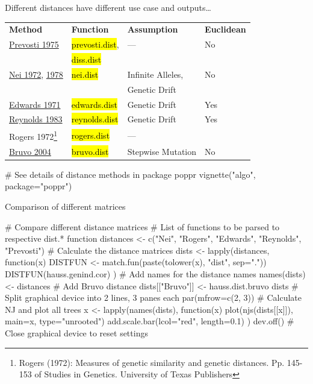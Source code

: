 \documentclass[compress, ucs, xelatex, 11pt, xcolor=svgnames,
  hyperref={
    bookmarks=true,
    unicode=true,
    colorlinks=true,
    pdftitle={Molecular data in R},
    plainpages=false,
    pdfauthor={Vojtech Zeisek},
    pdfsubject={Course about phylogeny and evolution in R},
    pdfcreator={XeLaTeX},
    pdfkeywords={R, evolution, phylogeny, molecular data},
    linkcolor=Tomato,
    anchorcolor=SaddleBrown,
    citecolor=Goldenrod,
    filecolor=DarkMagenta,
    menucolor=Sienna,
    urlcolor=DarkTurquoise,
    pdftex},
  url={hyphens, lowtilde} %
  ]{beamer}
\renewcommand{\texttt}[1]{\hl{\ttfamily #1}}
\begin{document}
\begin{frame}[fragile]{Different distances have different use case and outputs\ldots}
  \vfill
  \begin{tabular}{llll}
    \textbf{Method} & \textbf{Function} & \textbf{Assumption} & \textbf{Euclidean}\\
    \href{http://link.springer.com/article/10.1007/BF00831894}{Prevosti 1975} & \texttt{prevosti.dist}, & --- & \alert{No}\\
     & \texttt{diss.dist} & & \\
    \href{http://www.jstor.org/stable/2459777}{Nei 1972}, \href{http://www.genetics.org/content/89/3/583.short}{1978} & \texttt{nei.dist} & Infinite Alleles, & \alert{No}\\
     & & Genetic Drift & \\
    \href{http://www.jstor.org/stable/2528824}{Edwards 1971} & \texttt{edwards.dist} & Genetic Drift & Yes\\
    \href{http://www.genetics.org/node/324318.full}{Reynolds 1983} & \texttt{reynolds.dist} & Genetic Drift & Yes\\
    Rogers 1972\footnote{Rogers (1972): Measures of genetic similarity and genetic distances. Pp. 145-153 of Studies in Genetics. University of Texas Publishers} & \texttt{rogers.dist} & --- &\\
    \href{http://onlinelibrary.wiley.com/doi/10.1111/j.1365-294X.2004.02209.x/full}{Bruvo 2004} & \texttt{bruvo.dist} & Stepwise Mutation & \alert{No}
  \end{tabular}
  \vfill
  \begin{spluscode}
    # See details of distance methods in package poppr
    vignette("algo", package="poppr")
  \end{spluscode}
  \vfill
\end{frame}

\begin{frame}[fragile]{Comparison of different matrices}
  \begin{spluscode}
    # Compare different distance matrices
    # List of functions to be parsed to respective dist.* function
    distances <- c("Nei", "Rogers", "Edwards", "Reynolds", "Prevosti")
    # Calculate the distance matrices
    dists <- lapply(distances, function(x) {
      DISTFUN <- match.fun(paste(tolower(x), "dist", sep="."))
      DISTFUN(hauss.genind.cor) })
    # Add names for the distance names
    names(dists) <- distances
    # Add Bruvo distance
    dists[["Bruvo"]] <- hauss.dist.bruvo
    dists
    # Split graphical device into 2 lines, 3 panes each
    par(mfrow=c(2, 3))
    # Calculate NJ and plot all trees
    x <- lapply(names(dists), function(x) {
      plot(njs(dists[[x]]), main=x, type="unrooted")
      add.scale.bar(lcol="red", length=0.1) })
    dev.off() # Close graphical device to reset settings
  \end{spluscode}
\end{frame}
\end{document}

